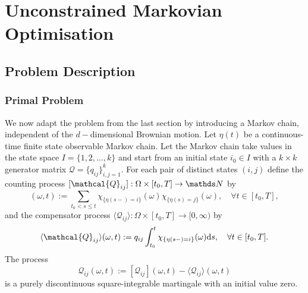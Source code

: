 \section{Unconstrained Markovian Optimisation}
\subsection{Problem Description}
\subsubsection{Primal Problem}
We now adapt the problem from the last section by introducing a Markov chain, independent of the $d-$dimensional Brownian motion. Let $\eta(t)$ be a continuous-time finite state observable Markov chain. Let the Markov chain take values in the state space $I = \{ 1, 2, \dots, k\}$ and start from an initial state $i_0 \in I$ with a $k \times k$ generator matrix $\mathcal{Q} = \{ {q}_{i j} \}_{i,j = 1}^k$. For each pair of distinct states $(i,j)$ define the counting process $[\mathcal{Q}_{ij}] : \Omega \times [t_0, T] \to \N$ by
\begin{equation*}
    [\mathcal{Q}_{ij}](\omega, t):= \sum_{t_0 < s \le t} \chi_{ \{\eta(s-) = i\}}(\omega) \chi_{\{ \eta(s) = j \}}(\omega), \quad \forall t \in [t_0, T],
\end{equation*}
and the compensator process $\langle \mathcal{Q}_{ij} \rangle: \Omega \times [t_0, T] \to [0, \infty)$ by
\begin{equation*}
    \langle \mathcal{Q}_{ij} \rangle (\omega, t) := q_{ij} \int_{t_0}^t \chi_{\{ \eta(s-)=i \}}(\omega) \d s, \quad \forall t \in [t_0, T].
\end{equation*}
The process
\begin{equation*}
    \mathcal{Q}_{ij}(\omega, t) := [\mathcal{Q}_{ij}](\omega, t) - \langle \mathcal{Q}_{ij} \rangle (\omega, t)
\end{equation*}
is a purely discontinuous square-integrable martingale with an initial value zero.\\


